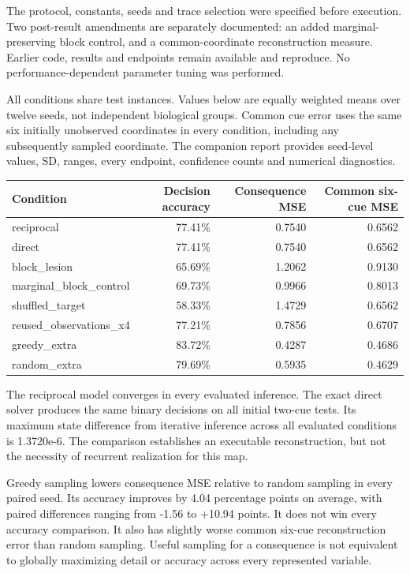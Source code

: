 \documentclass[
  american,
  11pt,
  letterpaper,
]{article}
\newcounter{none} %
\begin{document}
The protocol, constants, seeds and trace selection were specified before execution. Two post-result amendments are separately documented: an added marginal-preserving block control, and a common-coordinate reconstruction measure. Earlier code, results and endpoints remain available and reproduce. No performance-dependent parameter tuning was performed.

All conditions share test instances. Values below are equally weighted means over twelve seeds, not independent biological groups. Common cue error uses the same six initially unobserved coordinates in every condition, including any subsequently sampled coordinate. The companion report provides seed-level values, SD, ranges, every endpoint, confidence counts and numerical diagnostics.

{\def\LTcaptype{none} %
\begin{longtable}[]{@{}lrrr@{}}
\toprule\noalign{}
Condition & Decision accuracy & Consequence MSE & Common six-cue MSE \\
\midrule\noalign{}
\endhead
\bottomrule\noalign{}
\endlastfoot
reciprocal & 77.41\% & 0.7540 & 0.6562 \\
direct & 77.41\% & 0.7540 & 0.6562 \\
block\_lesion & 65.69\% & 1.2062 & 0.9130 \\
marginal\_block\_control & 69.73\% & 0.9966 & 0.8013 \\
shuffled\_target & 58.33\% & 1.4729 & 0.6562 \\
reused\_observations\_x4 & 77.21\% & 0.7856 & 0.6707 \\
greedy\_extra & 83.72\% & 0.4287 & 0.4686 \\
random\_extra & 79.69\% & 0.5935 & 0.4629 \\
\end{longtable}
}

The reciprocal model converges in every evaluated inference. The exact direct solver produces the same binary decisions on all initial two-cue tests. Its maximum state difference from iterative inference across all evaluated conditions is 1.3720e-6. The comparison establishes an executable reconstruction, but not the necessity of recurrent realization for this map.

Greedy sampling lowers consequence MSE relative to random sampling in every paired seed. Its accuracy improves by 4.04 percentage points on average, with paired differences ranging from -1.56 to +10.94 points. It does not win every accuracy comparison. It also has slightly worse common six-cue reconstruction error than random sampling. Useful sampling for a consequence is not equivalent to globally maximizing detail or accuracy across every represented variable.
\end{document}
